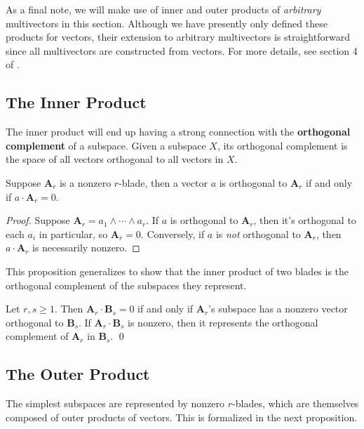 \documentclass[twoside,10pt]{article}
\begin{document}
As a final note, we will make use of inner and outer products of \textit{arbitrary} multivectors in this section. Although we have presently only defined these products for vectors, their extension to arbitrary multivectors is straightforward since all multivectors are constructed from vectors. For more details, see section 4 of \cite{chisolm}.

\subsection{The Inner Product}

The inner product will end up having a strong connection with the \textbf{orthogonal complement} of a subspace. Given a subspace $X$, its orthogonal complement is the space of all vectors orthogonal to all vectors in $X$.

\begin{prop}
	Suppose $\mathbf{A}_r$ is a nonzero $r$-blade, then a vector $a$ is orthogonal to $\mathbf{A}_r$ if and only if $a \cdot \mathbf{A}_r=0$.
\end{prop}
\begin{proof}
	Suppose $\mathbf{A}_r = a_1 \wedge \cdots \wedge a_r$. If $a$ is orthogonal to $\mathbf{A}_r$, then it's orthogonal to each $a_i$ in particular, so $\mathbf{A}_r =0$. Conversely, if $a$ is \textit{not} orthogonal to $\mathbf{A}_r$, then $a \cdot \mathbf{A}_r$ is necessarily nonzero.
\end{proof}

This proposition generalizes to show that the inner product of two blades is the orthogonal complement of the subspaces they represent.

\begin{thrm}[]
	Let $r, s \geq 1$. Then $\mathbf{A}_r \cdot \mathbf{B}_s = 0 $ if and only if $\mathbf{A}_r$'s subspace has a nonzero vector orthogonal to $\mathbf{B}_s$. If $\mathbf{A}_r \cdot \mathbf{B}_s$ is nonzero, then it represents the orthogonal complement of $\mathbf{A}_r$ in $\mathbf{B}_s$. \qed
\end{thrm}

\subsection{The Outer Product}

The simplest subspaces are represented by nonzero $r$-blades, which are themselves composed of outer products of vectors. This is formalized in the next proposition.
\end{document}
